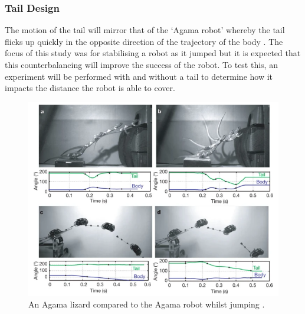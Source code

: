 \documentclass{article}
\begin{document}
\newpage
\subsubsection{Tail Design}
\label{sec:Tail Movement}
The motion of the tail will mirror that of the ‘Agama robot’ whereby the tail flicks up quickly in the opposite direction of the trajectory of the body . The focus of this study was for stabilising a robot as it jumped but it is expected that this counterbalancing  will improve the success of the robot. To test this, an experiment will be performed with and without a tail to determine how it impacts the distance the robot is able to cover. 
\begin{figure}[H]
\centering
\includegraphics[scale=0.6]{agamaJump}
\caption{An Agama lizard compared to the Agama robot whilst jumping \citep{agama}.}
\end{figure}
\end{document}
